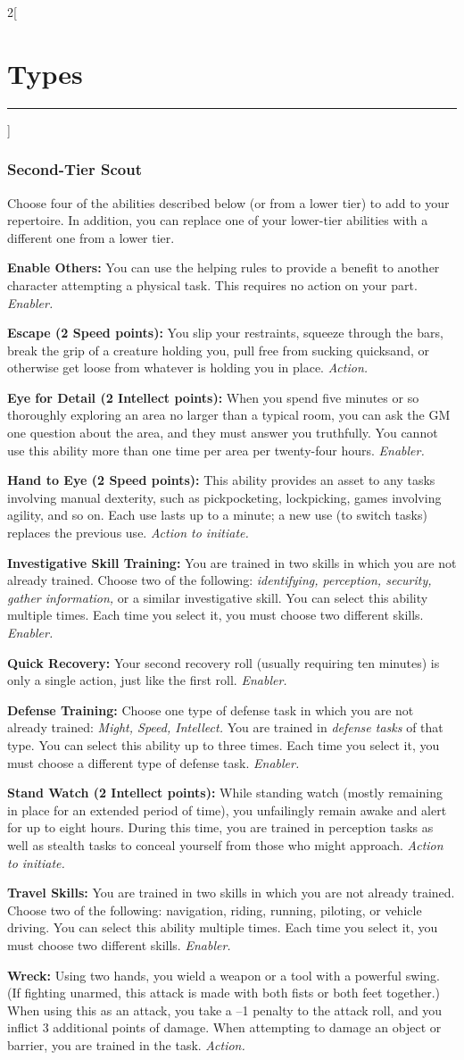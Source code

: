\documentclass[a4paper,10pt,final]{book}
\newcommand{\HRule}{\rule{\linewidth}{0.5mm}} %
\newcommand{\newSection}[1]{\section*{#1} \addcontentsline{toc}{section}{#1} \label{sec:#1} \HRule}
\newcommand{\itemAbility}[2]{\textcolor{25gray}{\textbullet\textbf{ #1:}} {#2}\par}
\newcommand{\enabler}{\textit{ Enabler.}}
\newcommand{\action}{\textit{ Action.}}
\newcommand{\actionInit}{\textit{ Action to initiate.}}
\newenvironment{docsection}[1]
{
  \begin{multicols*}{2}[\newSection{#1}]
}
{
  \end{multicols*}
  \newpage
}
\begin{document}
\begin{docsection}{Types}
\subsubsection*{Second-Tier Scout}
\label{subsub:scoutSecondTier}
Choose four of the abilities described
below (or from a lower tier) to add to your
repertoire. In addition, you can replace one
of your lower-tier abilities with a different
one from a lower tier. \par
\itemAbility{Enable Others}{You can use the helping
rules to provide a benefit to another
character attempting a physical task. This
requires no action on your part.\enabler}
\itemAbility{Escape (2 Speed points)}{You slip your
restraints, squeeze through the bars, break the
grip of a creature holding you, pull free from
sucking quicksand, or otherwise get loose
from whatever is holding you in place.\action}
\itemAbility{Eye for Detail (2 Intellect points)}{When
you spend five minutes or so thoroughly
exploring an area no larger than a typical
room, you can ask the GM one question
about the area, and they must answer you
truthfully. You cannot use this ability more
than one time per area per twenty-four
hours.\enabler}
\itemAbility{Hand to Eye (2 Speed points)}{This ability
provides an asset to any tasks involving
manual dexterity, such as pickpocketing,
lockpicking, games involving agility, and so
on. Each use lasts up to a minute; a new
use (to switch tasks) replaces the previous
use.\actionInit}
\itemAbility{Investigative Skill Training}{You are trained in two
skills in which you are not already trained.
Choose two of the following: \textit{identifying, perception, security, gather information,} or a similar investigative skill. 
You can select this ability multiple times. Each time you select it,
you must choose two different skills.\enabler}
\itemAbility{Quick Recovery}{Your second recovery
roll (usually requiring ten minutes) is only a
single action, just like the first roll.\enabler}
\itemAbility{Defense Training}{Choose one type of
defense task in which you are not already
trained: \textit{Might, Speed, Intellect.} You are
trained in \emph{defense tasks} of that type. You
can select this ability up to three times.
Each time you select it, you must choose a
different type of defense task.\enabler}
\itemAbility{Stand Watch (2 Intellect points)}{While
standing watch (mostly remaining in
place for an extended period of time), 
you unfailingly remain awake and alert for up
to eight hours. During this time, you are
trained in perception tasks as well as stealth
tasks to conceal yourself from those who
might approach.\actionInit}
\itemAbility{Travel Skills}{You are trained in two skills in
which you are not already trained. Choose two
of the following: navigation, riding, running,
piloting, or vehicle driving. You can select this
ability multiple times. Each time you select it,
you must choose two different skills.\enabler}
\itemAbility{Wreck}{Using two hands, you wield a
weapon or a tool with a powerful swing. (If
fighting unarmed, this attack is made with
both fists or both feet together.) When using
this as an attack, you take a –1 penalty to the
attack roll, and you inflict 3 additional points
of damage. When attempting to damage an
object or barrier, you are trained in the task.
\action}


\end{docsection}
\end{document}
